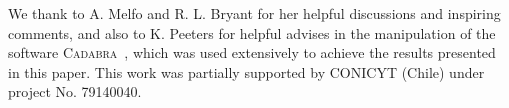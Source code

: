 \documentclass[aps,prl,twocolumn,superscriptaddress,showpacs,showkeys]{revtex4-1}
\begin{document}
\begin{acknowledgments}
  We thank to A. Melfo and R. L. Bryant for her helpful discussions and inspiring comments, and also to K. Peeters for helpful advises in the manipulation of the software \textsc{Cadabra}~\cite{Peeters:2007wn,*peeters2007symbolic,*Peeters2007550}, which was used extensively to achieve the results presented in this paper.
  This work was partially supported by CONICYT (Chile) under project No. 79140040.
\end{acknowledgments}




\end{document}
